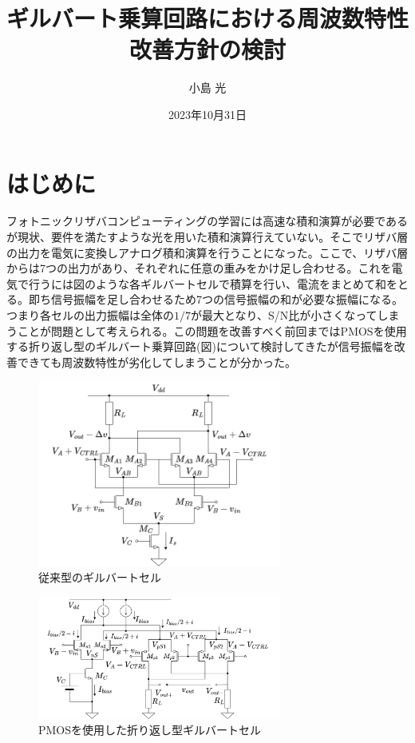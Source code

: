 \documentclass[twocolumn]{jsarticle}
\begin{document}
\title{ギルバート乗算回路における周波数特性改善方針の検討}
\author{小島 光}
\date{2023年10月31日}
\maketitle

\section{はじめに}
    フォトニックリザバコンピューティングの学習には高速な積和演算が必要であるが現状、要件を満たすような光を用いた積和演算行えていない。そこでリザバ層の出力を電気に変換しアナログ積和演算を行うことになった。ここで、リザバ層からは7つの出力があり、それぞれに任意の重みをかけ足し合わせる。これを電気で行うには図のような各ギルバートセルで積算を行い、電流をまとめて和をとる。即ち信号振幅を足し合わせるため7つの信号振幅の和が必要な振幅になる。つまり各セルの出力振幅は全体の$1/7$が最大となり、S/N比が小さくなってしまうことが問題として考えられる。この問題を改善すべく前回まではPMOSを使用する折り返し型のギルバート乗算回路(図)について検討してきたが信号振幅を改善できても周波数特性が劣化してしまうことが分かった。
    \begin{figure}[h]
        \begin{center}
            \includegraphics*[width=80mm]{figures/gilbert.png}
            \caption{従来型のギルバートセル}
            \label{fig:gilbert_conv}
        \end{center}
    \end{figure}
    \begin{figure}[H]
        \begin{center}
            \includegraphics*[width=80mm]{figures/folded_gilbert.png}
            \caption{PMOSを使用した折り返し型ギルバートセル}
            \label{fig:gilbert_folded_NtoP}
        \end{center}
    \end{figure}
\end{document}
